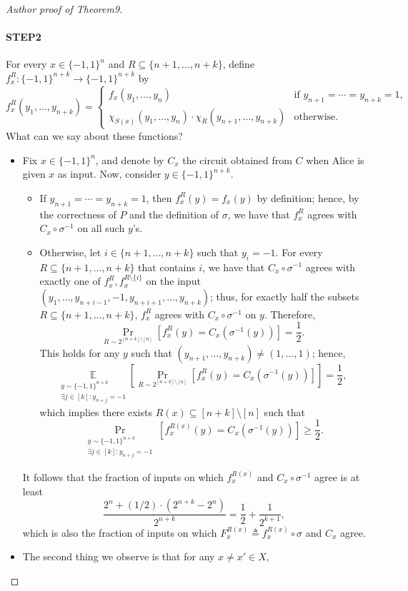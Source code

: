 \documentclass[10pt,a4paper]{article}
\begin{document}
\begin{proof}[Author proof of Theorem9]
\paragraph{STEP2}
For every $x\in\{-1,1\}^n$ and $R\subseteq\{n+1,\ldots,n+k\}$, define $f_x^R:\{-1,1\}^{n+k}\to\{-1,1\}^{n+k}$ by
\[f_x^R(y_1,\ldots,y_{n+k})=\begin{cases}f_x(y_1,\ldots,y_n)&\text{if }y_{n+1}=\cdots=y_{n+k}=1,\\\chi_{S(x)}(y_1,\ldots,y_n)\cdot\chi_R(y_{n+1},\ldots,y_{n+k})&\text{otherwise}.\end{cases}\]
What can we say about these functions?
\begin{itemize}
\item Fix $x\in\{-1,1\}^n$, and denote by $C_x$ the circuit obtained from $C$ when Alice is given $x$ as input. Now, consider $y\in\{-1,1\}^{n+k}$.
\begin{itemize}
\item If $y_{n+1}=\cdots=y_{n+k}=1$, then $f_x^R(y)=f_x(y)$ by definition; hence, by the correctness of $P$ and the definition of $\sigma$, we have that $f_x^R$ agrees with $C_x\circ\sigma^{-1}$ on all such $y$'s.
\item Otherwise, let $i\in\{n+1,\ldots,n+k\}$ such that $y_i=-1$. For every $R\subseteq\{n+1,\ldots,n+k\}$ that contains $i$, we have that $C_x\circ\sigma^{-1}$ agrees with exactly one of $f_x^R,f_x^{R\setminus\{i\}}$ on the input $(y_1,\ldots,y_{n+i-1},-1,y_{n+i+1},\ldots,y_{n+k})$; thus, for exactly half the subsets $R\subseteq\{n+1,\ldots,n+k\}$, $f_x^R$ agrees with $C_x\circ\sigma^{-1}$ on $y$. Therefore,
\[\Pr_{R\sim2^{[n+k]\setminus[n]}}[f_x^R(y)=C_x(\sigma^{-1}(y))]=\frac12.\]
This holds for any $y$ such that $(y_{n+1},\ldots,y_{n+k})\ne(1,\ldots,1)$; hence,
\[\underset{\substack{y\sim\{-1,1\}^{n+k}\\\exists j\in[k]:y_{n+j}=-1}}{\mathbb E}\left[\Pr_{R\sim2^{[n+k]\setminus[n]}}[f_x^R(y)=C_x(\sigma^{-1}(y))]\right]=\frac12,\]
which implies there exists $R(x)\subseteq[n+k]\setminus[n]$ such that
\[\Pr_{\substack{y\sim\{-1,1\}^{n+k}\\\exists j\in[k]:y_{n+j}=-1}}[f_x^{R(x)}(y)=C_x(\sigma^{-1}(y))]\geq\frac12.\]
\end{itemize}
It follows that the fraction of inputs on which $f_x^{R(x)}$ and $C_x\circ\sigma^{-1}$ agree is at least
\[\frac{2^n+(1/2)\cdot(2^{n+k}-2^n)}{2^{n+k}}=\frac12+\frac1{2^{k+1}},\]
which is also the fraction of inputs on which $F_x^{R(x)}\triangleq f_x^{R(x)}\circ\sigma$ and $C_x$ agree.
\item The second thing we observe is that for any $x\ne x'\in X$,

\end{itemize}
\end{proof}
\end{document}
